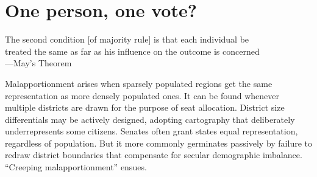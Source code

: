 \documentclass[letter,12pt]{article}
\begin{document}


\section{One person, one vote?}

\singlespacing
\begin{center}
The second condition [of majority rule] is that each individual be \\ treated the same as far as his influence on the outcome is concerned \\ ---May's Theorem \citeyearpar{may.1952condsMaj}
\end{center}
\onehalfspacing

Malapportionment arises when sparsely populated regions get the same representation as more densely populated ones. It can be found whenever multiple districts are drawn for the purpose of seat allocation. District size differentials may be actively designed, adopting cartography that deliberately underrepresents some citizens. Senates often grant states equal representation, regardless of population. But it more commonly germinates passively by failure to redraw district boundaries that compensate for secular demographic imbalance. ``Creeping malapportionment'' \citep{johnston.2002} ensues. 
\end{document}
